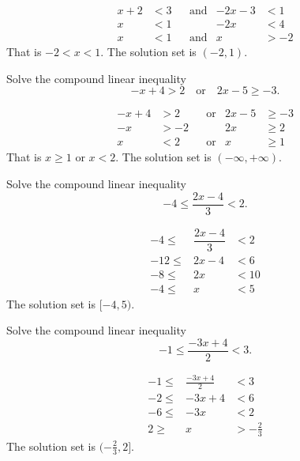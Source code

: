 \documentclass[en,12pt]{elegantbook}
\let\BeginKnitrBlock\begin \let\EndKnitrBlock\end
\begin{document}
\BeginKnitrBlock{solution}
{}\[
\begin{aligned}
    x+2 & <3 &  & \text{and} & -2x-3 & <1  \\
    x   & <1 &  &            & -2x   & <4  \\
    x   & <1 &  & \text{and} & x     & >-2
\end{aligned}
\]
That is \(-2<x<1\). The solution set is \((-2, 1)\).
\EndKnitrBlock{solution}

\BeginKnitrBlock{example}
\protect\hypertarget{exm:unnamed-chunk-227}{}{\label{exm:unnamed-chunk-227} }Solve the compound linear inequality\\
\[
-x+4>2 \quad \text{or} \quad 2x-5\geq -3.
\]
\EndKnitrBlock{example}

\BeginKnitrBlock{solution}
{}\[
\begin{aligned}
    -x+4 & >2  &  & \text{or} & 2x-5 & \geq -3 \\
    -x   & >-2 &  &           & 2x   & \geq 2  \\
    x    & <2  &  & \text{or} & x    & \geq 1
\end{aligned}
\]
That is \(x\geq 1\) or \(x< 2\). The solution set is \((-\infty, +\infty)\).
\EndKnitrBlock{solution}

\BeginKnitrBlock{example}
\protect\hypertarget{exm:unnamed-chunk-229}{}{\label{exm:unnamed-chunk-229} }Solve the compound linear inequality
\[
-4\leq\dfrac{2x-4}{3}<2.
\]
\EndKnitrBlock{example}

\BeginKnitrBlock{solution}
{}\[
\begin{array}{rcl}
    -4\leq  & \dfrac{2x-4}{3}    & <2  \\
    -12\leq & 2x-4         & <6  \\
    -8\leq  & 2x                & <10 \\
    -4\leq  & x               & <5  
\end{array}
\]
The solution set is \([-4, 5)\).
\EndKnitrBlock{solution}

\BeginKnitrBlock{example}
\protect\hypertarget{exm:unnamed-chunk-231}{}{\label{exm:unnamed-chunk-231} }Solve the compound linear inequality
\[
-1\leq \dfrac{-3x+4}{2}<3.
\]
\EndKnitrBlock{example}

\BeginKnitrBlock{solution}
{}\[
\begin{array}{rcl}
    -1\leq & \frac{-3x+4}{2}  & <3        \\
    -2\leq & -3x+4          & <6        \\
    -6\leq & -3x           & <2        \\
    2\geq  & x            & >-\frac23
\end{array}
\]
The solution set is \((-\frac23, 2]\).
\EndKnitrBlock{solution}
\end{document}
